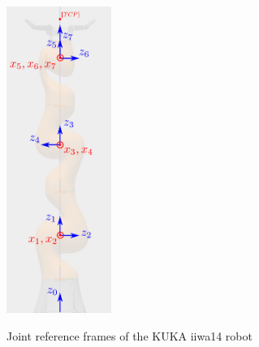 \begin{figure}[htbp]
\centering
\includegraphics[height=10cm]{images/iiwa-frames.png}\\
\caption{Joint reference frames of the KUKA iiwa14 robot}
\end{figure}


